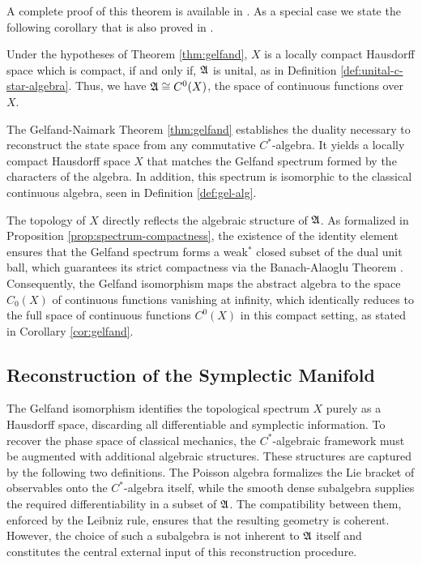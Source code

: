 	\noindent A complete proof of this theorem is available in \cite[Theorem 2.1.11]{bratteliOperatorAlgebrasQuantum}. As a special case we state the following corollary that is also proved in \cite[Theorem 2.1.11A]{bratteliOperatorAlgebrasQuantum}.
	\begin{corollary}\label{cor:gelfand}
		Under the hypotheses of Theorem \ref{thm:gelfand}, $X$ is a locally compact Hausdorff space which is compact, if and only if, $\mathfrak{A}$ is unital, as in Definition \ref{def:unital-c-star-algebra}. Thus, we have $\mathfrak{A} \cong C^0(X)$, the space of continuous functions over $X$.
	\end{corollary}
	
	The Gelfand-Naimark Theorem \ref{thm:gelfand} establishes the duality necessary to reconstruct the state space from any commutative $C^*$-algebra. It yields a locally compact Hausdorff space $X$ that matches the Gelfand spectrum formed by the characters of the algebra. In addition, this spectrum is isomorphic to the classical continuous algebra, seen in Definition \ref{def:gel-alg}.
	
	The topology of $X$ directly reflects the algebraic structure of $\mathfrak{A}$.
	As formalized in Proposition \ref{prop:spectrum-compactness}, the existence of
	the identity element ensures that the Gelfand spectrum forms a weak$^*$ closed
	subset of the dual unit ball, which guarantees its strict compactness via the
	Banach-Alaoglu Theorem \cite[Theorem IV.21]{reedMethodsModernMathematical2003}. Consequently, the Gelfand isomorphism maps the abstract
	algebra to the space $C_0(X)$ of continuous functions vanishing at infinity,
	which identically reduces to the full space of continuous functions $C^0(X)$
	in this compact setting, as stated in Corollary \ref{cor:gelfand}.
	
	
	\subsection*{Reconstruction of the Symplectic Manifold}
	
	The Gelfand isomorphism identifies the topological spectrum $X$ purely as a Hausdorff space, discarding all differentiable and symplectic information. To recover the phase space of classical mechanics, the $C^*$-algebraic framework must be augmented with additional algebraic structures. These structures are captured by the following two definitions. The Poisson algebra formalizes the Lie bracket of observables onto the $C^*$-algebra itself, while the smooth dense subalgebra supplies the required differentiability in a subset of $\mathfrak{A}$. The compatibility between them, enforced by the Leibniz rule, ensures that the resulting geometry is coherent. However, the choice of such a subalgebra is not inherent to $\mathfrak{A}$ itself and constitutes the central external input of this reconstruction procedure.
	

